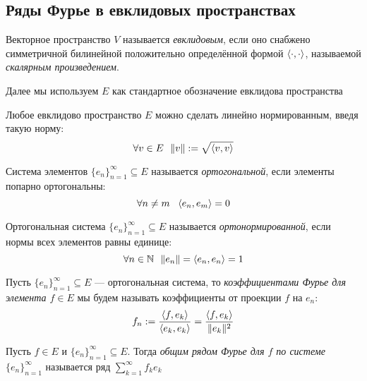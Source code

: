 \subsection{Ряды Фурье в евклидовых пространствах}

\begin{reminder}
	Векторное пространство $V$ называется \textit{евклидовым}, если оно снабжено симметричной билинейной положительно определённой формой $\left\langle\cdot, \cdot\right\rangle$, называемой \textit{скалярным произведением}.
\end{reminder}

\begin{note}
	Далее мы используем $E$ как стандартное обозначение евклидова пространства
\end{note}

\begin{reminder}
	Любое евклидово пространство $E$ можно сделать линейно нормированным, введя такую норму:
	\[
		\forall v \in E\ \ \|v\| := \sqrt{\left\langle v, v\right\rangle}
	\]
\end{reminder}

\begin{definition}
	Система элементов $\{e_n\}_{n = 1}^\infty \subseteq E$ называется \textit{ортогональной}, если элементы попарно ортогональны:
	\[
		\forall n \neq m\ \ \left\langle e_n, e_m\right\rangle = 0
	\]
\end{definition}

\begin{definition}
	Ортогональная система $\{e_n\}_{n = 1}^\infty \subseteq E$ называется \textit{ортонормированной}, если нормы всех элементов равны единице:
	\[
		\forall n \in \mathbb{N}\ \ \|e_n\| = \left\langle e_n, e_n\right\rangle = 1
	\]
\end{definition}

\begin{definition}
	Пусть $\{e_n\}_{n = 1}^\infty \subseteq E$ --- ортогональная система, то \textit{коэффициентами Фурье для элемента $f \in E$} мы будем называть коэффициенты от проекции $f$ на $e_n$:
	\[
		f_n := \frac{\left\langle f, e_k\right\rangle}{\left\langle e_k, e_k\right\rangle} = \frac{\left\langle f, e_k\right\rangle}{\|e_k\|^2}
	\]
\end{definition}

\begin{definition}
	Пусть $f \in E$ и $\{e_n\}_{n = 1}^\infty \subseteq E$. Тогда \textit{общим рядом Фурье для $f$ по системе $\{e_n\}_{n = 1}^\infty$} называется ряд $\sum_{k = 1}^\infty f_ke_k$
\end{definition}

